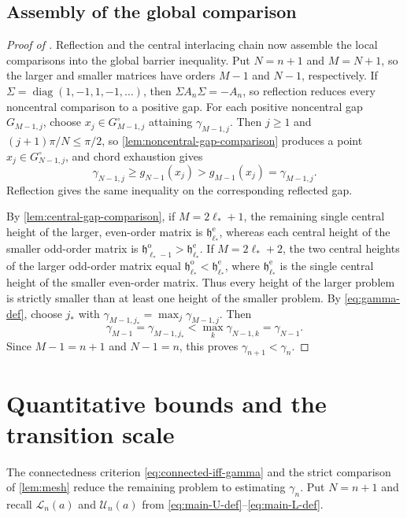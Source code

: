 \documentclass[11pt,a4paper]{article}
\numberwithin{equation}{section}
\DeclareMathOperator{\diag}{diag}
\begin{document}
\subsection{Assembly of the global comparison}
\label{subsec:global-comparison}

\begin{proof}[Proof of ]
Reflection and the central interlacing chain now assemble the local
comparisons into the global barrier inequality.  Put \(N=n+1\) and
\(M=N+1\), so the
larger and smaller matrices have orders \(M-1\) and \(N-1\), respectively.  If
\(\Sigma=\diag(1,-1,1,-1,\ldots)\), then
\(\Sigma A_n\Sigma=-A_n\), so reflection reduces every noncentral
comparison to a positive gap.  For each positive noncentral gap
\(G_{M-1,j}\), choose
\(x_j\in G_{M-1,j}^{\circ}\) attaining \(\gamma_{M-1,j}\).  Then
\(j\geq1\) and \((j+1)\pi/N\leq\pi/2\), so
\cref{lem:noncentral-gap-comparison} produces a point
\(\widehat x_j\in G_{N-1,j}^{\circ}\), and chord exhaustion gives
\[
 \gamma_{N-1,j}\geq g_{N-1}(\widehat x_j)
 >g_{M-1}(x_j)=\gamma_{M-1,j}.
\]
Reflection gives the same inequality on the corresponding reflected gap.

By \cref{lem:central-gap-comparison}, if \(M=2\ell_*+1\), the remaining
single central height of the larger, even-order matrix is
\(\mathfrak h_{\ell_*}^{\mathrm e}\),
whereas each central height of the
smaller odd-order matrix is
\(\mathfrak h_{\ell_*-1}^{\mathrm o}>\mathfrak h_{\ell_*}^{\mathrm e}\).  If
\(M=2\ell_*+2\), the two central heights of the larger odd-order matrix
equal
\(\mathfrak h_{\ell_*}^{\mathrm o}<\mathfrak h_{\ell_*}^{\mathrm e}\),
where \(\mathfrak h_{\ell_*}^{\mathrm e}\) is the single
central height of the smaller even-order matrix.
Thus every height of the larger problem is strictly smaller than at
least one height of the smaller problem.  By \eqref{eq:gamma-def}, choose
\(j_*\) with
\(\gamma_{M-1,j_*}=\max_j\gamma_{M-1,j}\).  Then
\[
 \gamma_{M-1}=\gamma_{M-1,j_*}
 <\max_k\gamma_{N-1,k}=\gamma_{N-1}.
\]
Since \(M-1=n+1\) and \(N-1=n\), this proves
\(\gamma_{n+1}<\gamma_n\).
\end{proof}

\section{Quantitative bounds and the transition scale}
\label{sec:topology-bounds}

The connectedness criterion \eqref{eq:connected-iff-gamma} and the strict
comparison of \cref{lem:mesh} reduce the remaining problem to estimating
\(\gamma_n\).  Put \(N=n+1\) and recall \(\mathcal L_n(a)\) and
\(\mathcal U_n(a)\) from
\eqref{eq:main-U-def}--\eqref{eq:main-L-def}.
\end{document}
